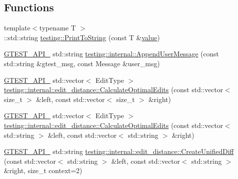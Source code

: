\subsection*{Functions}
\begin{DoxyCompactItemize}
\item 
{\footnotesize template$<$typename T $>$ }\\\+::std\+::string \mbox{\hyperlink{namespacetesting_aa5717bb1144edd1d262d310ba70c82ed}{testing\+::\+Print\+To\+String}} (const T \&\mbox{\hyperlink{_obj__test_2lib_2googletest-master_2googlemock_2test_2gmock-matchers__test_8cc_a337b8a670efc0b086ad3af163f3121b6}{value}})
\item 
\mbox{\hyperlink{_obj__test_2lib_2googletest-release-1_88_81_2googletest_2include_2gtest_2internal_2gtest-port_8h_aa73be6f0ba4a7456180a94904ce17790}{G\+T\+E\+S\+T\+\_\+\+A\+P\+I\+\_\+}} std\+::string \mbox{\hyperlink{namespacetesting_1_1internal_ae475a090bca903bb222dd389eb189166}{testing\+::internal\+::\+Append\+User\+Message}} (const std\+::string \&gtest\+\_\+msg, const Message \&user\+\_\+msg)
\item 
\mbox{\hyperlink{_obj__test_2lib_2googletest-release-1_88_81_2googletest_2include_2gtest_2internal_2gtest-port_8h_aa73be6f0ba4a7456180a94904ce17790}{G\+T\+E\+S\+T\+\_\+\+A\+P\+I\+\_\+}} std\+::vector$<$ Edit\+Type $>$ \mbox{\hyperlink{namespacetesting_1_1internal_1_1edit__distance_a26323b4c2a29ea8e187aafbd4d2275db}{testing\+::internal\+::edit\+\_\+distance\+::\+Calculate\+Optimal\+Edits}} (const std\+::vector$<$ size\+\_\+t $>$ \&left, const std\+::vector$<$ size\+\_\+t $>$ \&right)
\item 
\mbox{\hyperlink{_obj__test_2lib_2googletest-release-1_88_81_2googletest_2include_2gtest_2internal_2gtest-port_8h_aa73be6f0ba4a7456180a94904ce17790}{G\+T\+E\+S\+T\+\_\+\+A\+P\+I\+\_\+}} std\+::vector$<$ Edit\+Type $>$ \mbox{\hyperlink{namespacetesting_1_1internal_1_1edit__distance_a32267b2ae24de1de175ac8217406877d}{testing\+::internal\+::edit\+\_\+distance\+::\+Calculate\+Optimal\+Edits}} (const std\+::vector$<$ std\+::string $>$ \&left, const std\+::vector$<$ std\+::string $>$ \&right)
\item 
\mbox{\hyperlink{_obj__test_2lib_2googletest-release-1_88_81_2googletest_2include_2gtest_2internal_2gtest-port_8h_aa73be6f0ba4a7456180a94904ce17790}{G\+T\+E\+S\+T\+\_\+\+A\+P\+I\+\_\+}} std\+::string \mbox{\hyperlink{namespacetesting_1_1internal_1_1edit__distance_ac4c24a581ff433d7aca7ed12c9133fb1}{testing\+::internal\+::edit\+\_\+distance\+::\+Create\+Unified\+Diff}} (const std\+::vector$<$ std\+::string $>$ \&left, const std\+::vector$<$ std\+::string $>$ \&right, size\+\_\+t context=2)

\end{DoxyCompactItemize}
